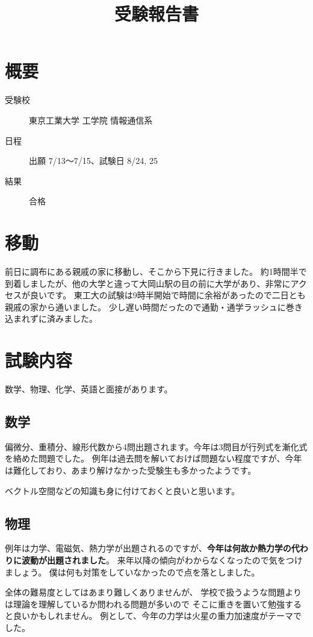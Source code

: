 \documentclass[]{jsarticle}
\title{受験報告書}
\date{}
\begin{document}
\maketitle
\section*{概要}
    \begin{description}
        \item[受験校] 東京工業大学 工学院 情報通信系
        \item[日程] 出願 7/13〜7/15、試験日 8/24, 25
        \item[結果] 合格
    \end{description}
\section*{移動}
    前日に調布にある親戚の家に移動し、そこから下見に行きました。
    約1時間半で到着しましたが、他の大学と違って大岡山駅の目の前に大学があり、非常にアクセスが良いです。
    東工大の試験は9時半開始で時間に余裕があったので二日とも親戚の家から通いました。
    少し遅い時間だったので通勤・通学ラッシュに巻き込まれずに済みました。
\section*{試験内容}
    数学、物理、化学、英語と面接があります。
    \subsection*{数学}
        偏微分、重積分、線形代数から4問出題されます。今年は3問目が行列式を漸化式を絡めた問題でした。
        例年は過去問を解いておけば問題ない程度ですが、今年は難化しており、あまり解けなかった受験生も多かったようです。

        ベクトル空間などの知識も身に付けておくと良いと思います。
    \subsection*{物理}
        例年は力学、電磁気、熱力学が出題されるのですが、{\bf 今年は何故か熱力学の代わりに波動が出題されました}。
        来年以降の傾向がわからなくなったので気をつけましょう。
        僕は何も対策をしていなかったので点を落としました。

        全体の難易度としてはあまり難しくありませんが、
        学校で扱うような問題よりは理論を理解しているか問われる問題が多いので
        そこに重きを置いて勉強すると良いかもしれません。
        例として、今年の力学は火星の重力加速度がテーマでした。
\end{document}
